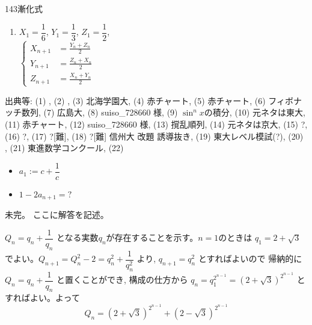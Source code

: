\begin{prob}{143}{}{漸化式}
\begin{enumerate}
	$\left\{
	\begin{aligned}
	 V_{n+1}&=\frac{2V_n}{W_n}-V_n^2 \\
	 W_{n+1}&=\frac{W_n^2}{2V_n^2W_n^2+1}
	\end{aligned}
	\right.$
  \item $X_1=\dfrac{1}{6}$, $Y_1=\dfrac{1}{3}$, $Z_1=\dfrac{1}{2}$, \\
	$\left\{
	\begin{aligned}
	 X_{n+1}&=\frac{Y_n+Z_n}{2} \\
	 Y_{n+1}&=\frac{Z_n+X_n}{2} \\
	 Z_{n+1}&=\frac{X_n+Y_n}{2}
	\end{aligned}
	\right.$
 \end{enumerate}
 出典等: (1) , (2) , (3)  北海学園大, (4)  赤チャート, (5)  赤チャート, (6)  フィボナッチ数列, (7)  広島大, (8)  suiso\_728660 様, (9)  $\sin^n x$の積分, (10)  元ネタは東大, (11)  赤チャート, (12)  suiso\_728660 様, (13)  撹乱順列, (14)  元ネタは京大, (15) \hosi ?, (16) \hosi ?, (17) \hosi ?[難], (18) \hosi ?[難] 信州大 改題 誘導抜き, (19)  東大レベル模試(?), (20) , (21)  東進数学コンクール, (22) 
 \begin{itemize}
  \setlength{\itemindent}{20pt}
  \item[hint17:] $a_1 := c+\dfrac{1}{c}$
  \item[hint18:] $1-2a_{n+1}=?$ 
 \end{itemize}
\end{prob}
未完。
ここに解答を記述。

$Q_n=q_n+\dfrac{1}{q_n}$ となる実数$q_n$が存在することを示す。$n=1$のときは $q_1=2+\sqrt{3}$でよい。$Q_{n+1}=Q_n^2-2= q_n^2+\dfrac{1}{q_n^2}$ より, $q_{n+1}=q_n^2$ とすればよいので 帰納的に $Q_n=q_n+\dfrac{1}{q_n}$ と置くことができ, 構成の仕方から $q_n=q_1^{2^{n-1}}=(2+\sqrt{3})^{2^{n-1}}$ とすればよい。よって
\[Q_n= (2+\sqrt{3})^{2^{n-1}}+ (2-\sqrt{3})^{2^{n-1}}\]


